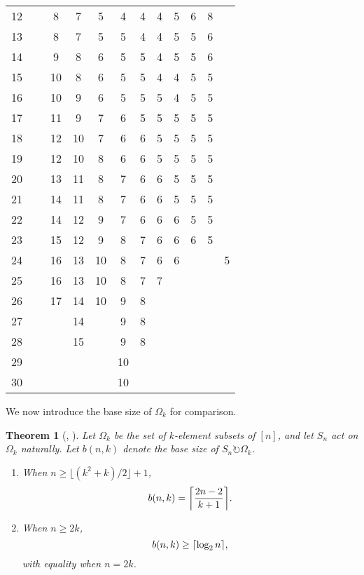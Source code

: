 \documentclass[12pt,twoside]{reedthesis}
\theoremstyle{plain}   %
\newtheorem{thm}{Theorem}[section] %
\theoremstyle{definition}
\theoremstyle{remark}
\numberwithin{equation}{section}
\def\acts{\circlearrowright} %
\DeclarePairedDelimiter\ceil{\lceil}{\rceil}
\begin{document}
\begin{table}[htbp]
\begin{center}
\begin{tabular}{c  c c c c c c c c c c c}
        12 & ~ & 8 & 7 & 5 & 4 & 4 & 4 & 5 & 6 & 8 & ~ \\ 
        13 & ~ & 8 & 7 & 5 & 5 & 4 & 4 & 5 & 5 & 6 & ~ \\ 
        14 & ~ & 9 & 8 & 6 & 5 & 5 & 4 & 5 & 5 & 6 & ~ \\ 
        15 & ~ & 10 & 8 & 6 & 5 & 5 & 4 & 4 & 5 & 5 & ~ \\ 
        16 & ~ & 10 & 9 & 6 & 5 & 5 & 5 & 4 & 5 & 5 & ~ \\ 
        17 & ~ & 11 & 9 & 7 & 6 & 5 & 5 & 5 & 5 & 5 & ~ \\ 
        18 & ~ & 12 & 10 & 7 & 6 & 6 & 5 & 5 & 5 & 5 & ~ \\ 
        19 & ~ & 12 & 10 & 8 & 6 & 6 & 5 & 5 & 5 & 5 & ~ \\ 
        20 & ~ & 13 & 11 & 8 & 7 & 6 & 6 & 5 & 5 & 5 & ~ \\ 
        21 & ~ & 14 & 11 & 8 & 7 & 6 & 6 & 5 & 5 & 5 & ~ \\ 
        22 & ~ & 14 & 12 & 9 & 7 & 6 & 6 & 6 & 5 & 5 & ~ \\ 
        23 & ~ & 15 & 12 & 9 & 8 & 7 & 6 & 6 & 6 & 5 & ~ \\ 
        24 & ~ & 16 & 13 & 10 & 8 & 7 & 6 & 6 & ~ & ~ & 5 \\ 
        25 & ~ & 16 & 13 & 10 & 8 & 7 & 7 & ~ & ~ & ~ & ~ \\ 
        26 & ~ & 17 & 14 & 10 & 9 & 8 & ~ & ~ & ~ & ~ & ~ \\ 
        27 & ~ & ~ & 14 & ~ & 9 & 8 & ~ & ~ & ~ & ~ & ~ \\ 
        28 & ~ & ~ & 15 & ~ & 9 & 8 & ~ & ~ & ~ & ~ & ~ \\ 
        29 & ~ & ~ & ~ & ~ & 10 & ~ & ~ & ~ & ~ & ~ & ~ \\ 
        30 & ~ & ~ & ~ & ~ & 10 & ~ & ~ & ~ & ~ & ~ & ~ \\ 
\bottomrule %
\end{tabular}
\end{center}
\label{tableone} %
\end{table}
We now introduce the base size of $\Omega_k$ for comparison.
\begin{thm}[{\cite{valle23}, \cite{spiga23}}]
  Let $\Omega_k$ be the set of $k$-element subsets of $[n]$, and let $S_n$ act on $\Omega_k$ naturally.
  Let $b(n,k)$ denote the base size of $S_n \acts \Omega_k$.
  \begin{enumerate}
  \item When $n \geq \lfloor (k^2 +k) / 2 \rfloor + 1$,
    \[ b(n,k) = \ceil*{ \dfrac{2n - 2}{k +1}}.\]
  \item When $n \geq 2k$,
    \[ b(n,k) \geq \ceil*{ \log_2 n },\]
    with equality when $n = 2k$.
  \end{enumerate}
\end{thm}
\end{document}
